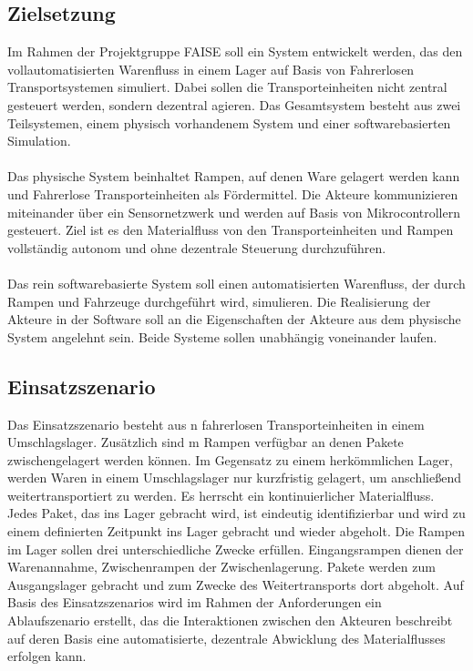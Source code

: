 \subsection{Zielsetzung}
Im Rahmen der Projektgruppe FAISE soll ein System entwickelt werden, das den vollautomatisierten Warenfluss in einem Lager auf Basis von Fahrerlosen Transportsystemen simuliert. Dabei sollen die Transporteinheiten nicht zentral gesteuert werden, sondern dezentral agieren.
Das Gesamtsystem besteht aus zwei Teilsystemen, einem physisch vorhandenem System und einer softwarebasierten Simulation. 
\\\\
Das physische System beinhaltet Rampen, auf denen Ware gelagert werden kann und Fahrerlose Transporteinheiten als Fördermittel. Die Akteure kommunizieren miteinander über ein Sensornetzwerk und werden auf Basis von Mikrocontrollern gesteuert. Ziel ist es den Materialfluss von den Transporteinheiten und Rampen vollständig autonom und ohne dezentrale Steuerung durchzuführen. 
\\\\
Das rein softwarebasierte System soll einen automatisierten Warenfluss, der durch Rampen und Fahrzeuge durchgeführt wird, simulieren. Die Realisierung der Akteure in der Software soll an die Eigenschaften der Akteure aus dem physische System angelehnt sein. Beide Systeme sollen unabhängig voneinander laufen. 

\subsection{Einsatzszenario}\label{Einsatzszenario} 
Das Einsatzszenario besteht aus n fahrerlosen Transporteinheiten in einem Umschlagslager. Zusätzlich sind m Rampen verfügbar an denen Pakete zwischengelagert werden können. Im Gegensatz zu einem herkömmlichen Lager, werden Waren in einem Umschlagslager nur kurzfristig gelagert, um anschließend weitertransportiert zu werden. Es herrscht ein kontinuierlicher Materialfluss. Jedes Paket, das ins Lager gebracht wird, ist eindeutig identifizierbar und wird zu einem definierten Zeitpunkt ins Lager gebracht und wieder abgeholt. Die Rampen im Lager sollen drei unterschiedliche Zwecke erfüllen. Eingangsrampen dienen der Warenannahme, Zwischenrampen der Zwischenlagerung. Pakete werden zum Ausgangslager gebracht und zum Zwecke des Weitertransports dort abgeholt. Auf Basis des Einsatzszenarios wird im Rahmen der Anforderungen ein Ablaufszenario erstellt, das die Interaktionen zwischen den Akteuren beschreibt auf deren Basis eine automatisierte, dezentrale Abwicklung des Materialflusses erfolgen kann.


